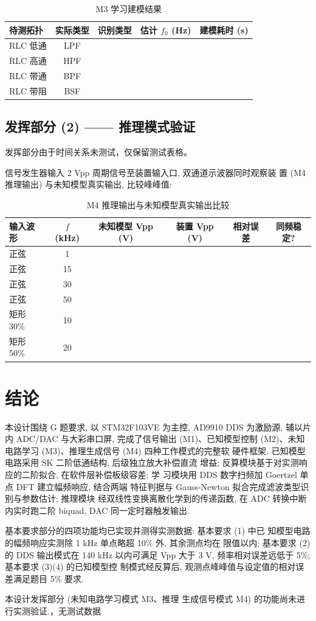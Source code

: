\documentclass[a4paper]{article}
\begin{document}
\begin{table}[H]
\centering
\caption{M3 学习建模结果}
\begin{tabular}{lcccc}
\toprule
待测拓扑 & 实际类型 & 识别类型 & 估计 $f_0$ (Hz) & 建模耗时 (s) \\
\midrule
RLC 低通 & LPF & & & \\
RLC 高通 & HPF & & & \\
RLC 带通 & BPF & & & \\
RLC 带阻 & BSF & & & \\
\bottomrule
\end{tabular}
\end{table}


\subsection{发挥部分 (2) —— 推理模式验证}
发挥部分由于时间关系未测试，仅保留测试表格。

信号发生器输入 2 Vpp 周期信号至装置输入口, 双通道示波器同时观察装
置 (M4 推理输出) 与未知模型真实输出, 比较峰峰值:

\begin{table}[H]
\centering
\caption{M4 推理输出与未知模型真实输出比较}
\begin{tabular}{lccccc}
\toprule
输入波形 & $f$ (kHz) & 未知模型 Vpp (V)
         & 装置 Vpp (V) & 相对误差 & 同频稳定? \\
\midrule
正弦     & 1   & & & & \\
正弦     & 15  & & & & \\
正弦     & 30  & & & & \\
正弦     & 50  & & & & \\
矩形 30\% & 10  & & & & \\
矩形 50\% & 20  & & & & \\
\bottomrule
\end{tabular}
\end{table}
\section{结论}

本设计围绕 G 题要求, 以 STM32F103VE 为主控, AD9910 DDS 为激励源,
辅以片内 ADC/DAC 与大彩串口屏, 完成了信号输出 (M1)、已知模型控制
(M2)、未知电路学习 (M3)、推理生成信号 (M4) 四种工作模式的完整软
硬件框架. 已知模型电路采用 SK 二阶低通结构, 后级独立放大补偿直流
增益; 反算模块基于对实测响应的二阶拟合, 在软件层补偿板级容差; 学
习模块用 DDS 数字扫频加 Goertzel 单点 DFT 建立幅频响应, 结合两端
特征判据与 Gauss-Newton 拟合完成滤波类型识别与参数估计; 推理模块
经双线性变换离散化学到的传递函数, 在 ADC 转换中断内实时跑二阶
biquad, DAC 同一定时器触发输出.

基本要求部分的四项功能均已实现并测得实测数据: 基本要求 (1) 中已
知模型电路的幅频响应实测除 1 kHz 单点略超 10\% 外, 其余测点均在
限值以内; 基本要求 (2) 的 DDS 输出模式在 140 kHz 以内可满足 Vpp
大于 3 V, 频率相对误差远低于 5\%; 基本要求 (3)(4) 的已知模型控
制模式经反算后, 观测点峰峰值与设定值的相对误差满足题目 5\% 要求.

本设计发挥部分 (未知电路学习模式 M3、推理
生成信号模式 M4) 的功能尚未进行实测验证.，无测试数据
\end{document}
